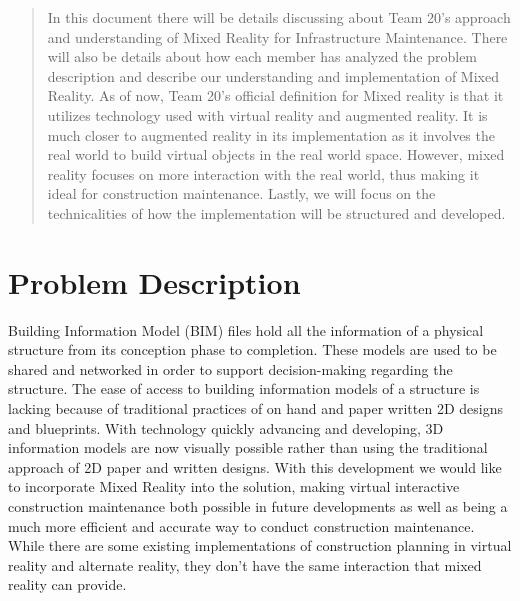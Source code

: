 \documentclass[onecolumn, draftclsnofoot,10pt, compsoc]{IEEEtran}
\begin{document}
\begin{titlepage}
\begin{singlespace}
\begin{abstract}
In this document there will be details discussing about Team 20's approach and understanding of Mixed Reality for Infrastructure Maintenance. There will also be details about how each member has analyzed the problem description and describe our understanding and implementation of Mixed Reality. As of now, Team 20's official definition for Mixed reality is that it utilizes technology used with virtual reality and augmented reality. It is much closer to augmented reality in its implementation as it involves the real world to build virtual objects in the real world space. However, mixed reality focuses on more interaction with the real world, thus making it ideal for construction maintenance. Lastly, we will focus on the technicalities of how the implementation will be structured and developed.
\end{abstract}
\end{singlespace}
\end{titlepage}
\newpage

\clearpage

\section{Problem Description}
Building Information Model (BIM) files hold all the information of a physical structure from its conception phase to completion. These models are used to be shared and networked in order to support decision-making regarding the structure. The ease of access to building information models of a structure is lacking because of traditional practices of on hand and paper written 2D designs and blueprints. With technology quickly advancing and developing, 3D information models are now visually possible rather than using the traditional approach of 2D paper and written designs. With this development we would like to incorporate Mixed Reality into the solution, making virtual interactive construction maintenance both possible in future developments as well as being a much more efficient and accurate way to conduct construction maintenance. While there are some existing implementations of construction planning in virtual reality and alternate reality, they don't have the same interaction that mixed reality can provide. 

\end{document}
